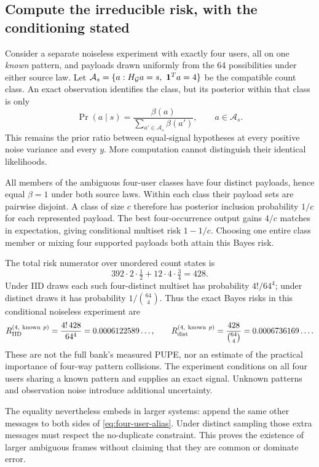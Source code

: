 \documentclass[10pt,a4paper]{article}
\begin{document}
\subsection{Compute the irreducible risk, with the conditioning stated}
Consider a separate noiseless experiment with exactly four users, all on one \emph{known} pattern, and payloads
drawn uniformly from the 64 possibilities under either source law. Let
$\mathcal A_s=\{a:H_{\mathcal G}a=s,\ \one^Ta=4\}$ be the compatible count class.
An exact observation identifies the class, but its posterior within that class is only
\begin{equation}
 \Pr(a\mid s)=\frac{\beta(a)}{\sum_{a'\in\mathcal A_s}\beta(a')},
 \qquad a\in\mathcal A_s.
 \label{eq:noiseless-class}
\end{equation}
This remains the prior ratio between equal-signal hypotheses at every positive noise variance and every $y$.
More computation cannot distinguish their identical likelihoods.

All members of the ambiguous four-user classes have four distinct payloads, hence equal $\beta=1$ under both
source laws. Within each class their payload sets are pairwise disjoint. A class of size $c$ therefore has
posterior inclusion probability $1/c$ for each represented payload. The best four-occurrence output gains
$4/c$ matches in expectation, giving conditional multiset risk $1-1/c$.
Choosing one entire class member or mixing four supported payloads both attain this Bayes risk.

The total risk numerator over unordered count states is
\[
 392\cdot2\cdot\tfrac12+12\cdot4\cdot\tfrac34=428.
\]
Under IID draws each such four-distinct multiset has probability $4!/64^4$; under distinct draws it has
probability $1/\binom{64}{4}$. Thus the exact Bayes risks in this conditional noiseless experiment are
\begin{equation}
 R_{\rm IID}^{(4,\ {\rm known}\ p)}
 =\frac{4!\,428}{64^4}=0.0006122589\ldots,\qquad
 R_{\rm dist}^{(4,\ {\rm known}\ p)}
 =\frac{428}{\binom{64}{4}}=0.0006736169\ldots.
 \label{eq:four-user-risk}
\end{equation}
These are not the full bank's measured PUPE, nor an estimate of the practical importance of four-way pattern
collisions. The experiment conditions on all four users sharing a known pattern and supplies an exact signal.
Unknown patterns and observation noise introduce additional uncertainty.

The equality nevertheless embeds in larger systems: append the same other messages to both sides of
\eqref{eq:four-user-alias}. Under distinct sampling those extra messages must respect the no-duplicate constraint.
This proves the existence of larger ambiguous frames without claiming that they are common or dominate error.
\end{document}
